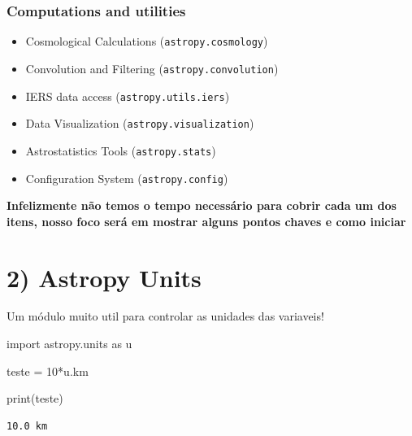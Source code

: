 \documentclass[
  letterpaper,
  DIV=11,
  numbers=noendperiod]{scrreprt}
\newenvironment{Shaded}{\begin{snugshade}}{\end{snugshade}}
\newcommand{\BuiltInTok}[1]{\textcolor[rgb]{0.00,0.23,0.31}{#1}}
\newcommand{\DecValTok}[1]{\textcolor[rgb]{0.68,0.00,0.00}{#1}}
\newcommand{\ImportTok}[1]{\textcolor[rgb]{0.00,0.46,0.62}{#1}}
\newcommand{\NormalTok}[1]{\textcolor[rgb]{0.00,0.23,0.31}{#1}}
\newcommand{\OperatorTok}[1]{\textcolor[rgb]{0.37,0.37,0.37}{#1}}
\providecommand{\tightlist}{%
  \setlength{\itemsep}{0pt}\setlength{\parskip}{0pt}}
\begin{document}
\subsubsection{Computations and
utilities}\label{computations-and-utilities}

\begin{itemize}
\tightlist
\item
  Cosmological Calculations (\texttt{astropy.cosmology})
\item
  Convolution and Filtering (\texttt{astropy.convolution})
\item
  IERS data access (\texttt{astropy.utils.iers})
\item
  Data Visualization (\texttt{astropy.visualization})
\item
  Astrostatistics Tools (\texttt{astropy.stats})
\item
  Configuration System (\texttt{astropy.config})
\end{itemize}

\textbf{Infelizmente não temos o tempo necessário para cobrir cada um
dos itens, nosso foco será em mostrar alguns pontos chaves e como
iniciar}

\section{2) Astropy Units}\label{astropy-units}

Um módulo muito util para controlar as unidades das variaveis!

\begin{Shaded}
\begin{Highlighting}[]
\ImportTok{import}\NormalTok{ astropy.units }\ImportTok{as}\NormalTok{ u}
\end{Highlighting}
\end{Shaded}

\begin{Shaded}
\begin{Highlighting}[]
\NormalTok{teste }\OperatorTok{=} \DecValTok{10}\OperatorTok{*}\NormalTok{u.km}
\end{Highlighting}
\end{Shaded}

\begin{Shaded}
\begin{Highlighting}[]
\BuiltInTok{print}\NormalTok{(teste)}
\end{Highlighting}
\end{Shaded}

\begin{verbatim}
10.0 km
\end{verbatim}
\end{document}
